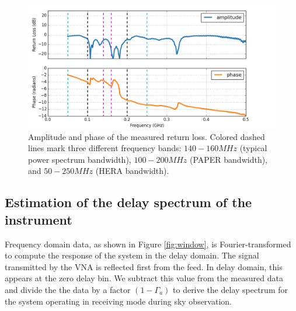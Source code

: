 \documentclass[iop]{emulateapj}
\begin{document}
\begin{figure}
\centering
\includegraphics[totalheight=0.3\textheight]{plots/frequency_amp_phase_fullbw.png}
\caption{Amplitude and phase of the measured return loss. Colored dashed lines
mark three different frequency bands: $140-160MHz$ (typical power spectrum bandwidth),
$100-200MHz$ (PAPER bandwidth), and
$50-250MHz$ (HERA bandwidth).}
\label{fig:freq}
\end{figure}

\subsection{Estimation of the delay spectrum of the instrument}
Frequency domain data, as shown in Figure \ref{fig:window}, is Fourier-transformed to compute the response of the system in the delay domain. The signal transmitted by the VNA is reflected first from the feed. In delay domain,  this appears at the zero delay bin. We subtract this value from the measured data and divide the the data by a factor $(1-\Gamma_{a})$ to derive the delay spectrum for the system operating in receiving mode during sky observation.   %
\end{document}
